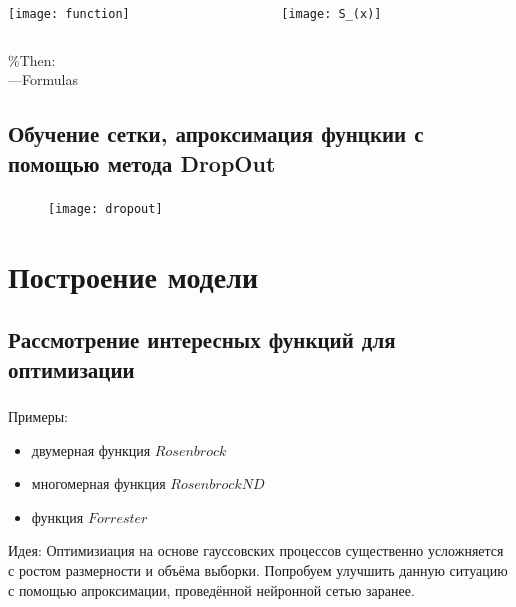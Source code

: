 \documentclass[t]{beamer}
\begin{document}
\begin{frame}
\frametitle{\insertsection}
\framesubtitle{\insertsubsection}
\begin{columns}[T] %
\begin{column}[T]{6cm} %
\texttt{[image: function]}
\end{column}
\begin{column}[T]{6cm}
\texttt{[image: S\_(x)]}
\end{column}
\end{columns}

\%Then:\\
---Formulas

\end{frame}



\subsection{Обучение сетки, апроксимация фунцкии с помощью метода DropOut}

\begin{frame}
\frametitle{\insertsection}
\framesubtitle{\insertsubsection}

\begin{figure}[H]
	\centering
	\texttt{[image: dropout]} 
\end{figure}
\end{frame}


\section{Построение модели}


\subsection{Рассмотрение интересных функций для оптимизации}
\begin{frame}
\frametitle{\insertsection}
\framesubtitle{\insertsubsection}


Примеры:
\begin{itemize}
	\item двумерная функция $Rosenbrock$
	\item многомерная функция $RosenbrockND$
	\item функция $Forrester$
\end{itemize}

Идея: Оптимизиация на основе \alert{гауссовских процессов} существенно усложняется с ростом размерности и объёма выборки. Попробуем улучшить данную ситуацию с помощью апроксимации, проведённой нейронной сетью заранее.

\end{frame}
\end{document}
